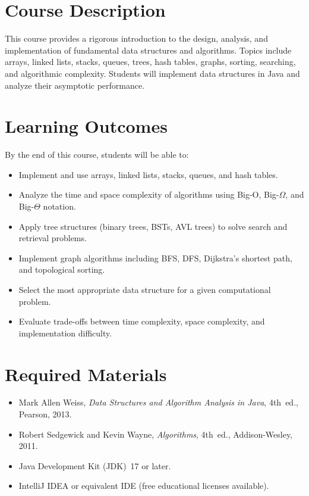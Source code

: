 \documentclass[
    language=english,
    doctype=course-material,
    institution=none,
]{../../omnilatex}
\begin{document}
\maketitle

\section{Course Description}

This course provides a rigorous introduction to the design, analysis, and
implementation of fundamental data structures and algorithms.  Topics include
arrays, linked lists, stacks, queues, trees, hash tables, graphs, sorting,
searching, and algorithmic complexity.  Students will implement data structures
in \textsf{Java} and analyze their asymptotic performance.

\section{Learning Outcomes}

By the end of this course, students will be able to:

\begin{itemize}
    \item Implement and use arrays, linked lists, stacks, queues, and hash tables.
    \item Analyze the time and space complexity of algorithms using Big-O, Big-$\Omega$,
          and Big-$\Theta$ notation.
    \item Apply tree structures (binary trees, BSTs, AVL trees) to solve search
          and retrieval problems.
    \item Implement graph algorithms including BFS, DFS, Dijkstra's shortest path,
          and topological sorting.
    \item Select the most appropriate data structure for a given computational problem.
    \item Evaluate trade-offs between time complexity, space complexity, and
          implementation difficulty.
\end{itemize}

\section{Required Materials}

\begin{itemize}
    \item Mark Allen Weiss, \emph{Data Structures and Algorithm Analysis in Java},
          4th~ed., Pearson, 2013.
    \item Robert Sedgewick and Kevin Wayne, \emph{Algorithms}, 4th~ed.,
          Addison-Wesley, 2011.
    \item Java Development Kit (JDK)~17 or later.
    \item IntelliJ IDEA or equivalent IDE (free educational licenses available).
\end{itemize}
\end{document}
